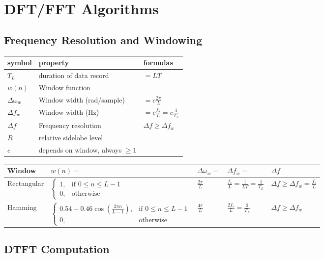\section{DFT/FFT Algorithms}
\subsection{Frequency Resolution and Windowing}
\begin{tabular}{|l|l|l|}
	\hline
	symbol & property & formulas
	\\ \hline
	$T_L$ & duration of data record & $ = LT$
	\\ \hline
	$w(n)$ & Window function &
	\\ \hline
	$\Delta \omega_w$ & Window width (rad/sample) & $ = c \frac{2 \pi}{L}$
	\\ \hline
	$\Delta f_w$ & Window width (Hz) & $ = c \frac{f_s}{L} = c \frac{1}{T_L} $
	\\ \hline
	$\Delta f$ & Frequency resolution & $ \Delta f \geq \Delta f_w$
	\\ \hline
	$R$ & relative sidelobe level &
	\\ \hline
	$c$ & depends on window, always $\geq 1$ &
	\\ \hline
\end{tabular}


\begin{tabularx}{\textwidth}{|l|l|l|l|X|}
	\hline
	\textbf{Window} & $w(n) = $ & $\Delta\omega_w =$ & $\Delta f_w = $ & $\Delta f$
	\\ \hline
	Rectangular &
	$ \begin{cases}
			1, & \text{if } 0 \leq n \leq L-1 \\
			0, & \text{otherwise}
	  \end{cases}$ &
	$ \frac{2\pi}{L}$ &
	$ \frac{f_s}{L} = \frac{1}{LT} = \frac{1}{T_L}$ &
	$ \Delta f \geq \Delta f_w = \frac{f_s}{L}$
	\\ \hline
	Hamming &
	$ \begin{cases}
		0.54 - 0.46 \cos(\frac{2\pi n}{L-1}), & \text{if } 0 \leq n \leq L-1 \\
		0, & \text{otherwise}
	  \end{cases}$ &
	$\frac{4\pi}{L}$ &
	$\frac{2f_s}{L} = \frac{2}{T_L} $ &
	$\Delta f \geq \Delta f_w $
	\\ \hline
\end{tabularx}

\subsection{DTFT Computation}
